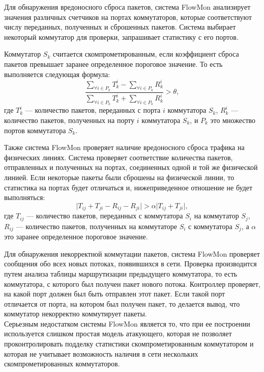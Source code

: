 \documentclass[../thesis.tex]{subfiles}
\begin{document}
Для обнаружения вредоносного сброса пакетов, система FlowMon анализирует значения различных счетчиков на портах коммутаторов, которые соответствуют числу переданных, полученных и сброшенных пакетов. 
Система выбирает некоторый коммутатор  для проверки, запрашивает статистику с его портов.

Коммутатор $S_k$ считается скомпрометированным, если коэффициент сброса пакетов превышает заранее определенное пороговое значение.
То есть выполняется следующая формула:
\begin{equation}
\frac{
    \sum_{\forall i\in P_k}{T^i_k} - \sum_{\forall i\in P_k}{R^i_k}
}{
    \sum_{\forall i\in P_k}{T^i_k} + \sum_{\forall i\in P_k}{R^i_k}
} > \theta,
\end{equation}
где $T^i_k$ --- количество пакетов, переданных с порта $i$ коммутатора $S_k$, $R^i_k$ --- количество пакетов, полученных на порту $i$ коммутатора $S_k$, и $P_k$ это множество портов коммутатора $S_k$.

Также система FlowMon проверяет наличие вредоносного сброса трафика на физических линиях.
Система проверяет соответствие количества пакетов, отправленных и полученных на портах, соединенных одной и той же физической линией.
Если некоторые пакеты были сброшены на физической линии, то статистика на портах будет отличаться и, нижеприведенное отношение не будет выполняться:
\begin{equation}
\Big|T_{ij} + T_{ji} - R_{ij} - R_{ji}\Big| > \alpha\Big|T_{ij} + T_{ji}\Big|,
\end{equation}
где $T_{ij}$ --- количество пакетов, переданных с коммутатора $S_i$ на коммутатор $S_j$, $R_{ij}$ --- количество пакетов, полученных на коммутаторе $S_i$ с коммутатора $S_j$, а $\alpha$ это заранее определенное пороговое значение.

Для обнаружения некорректной коммутации пакетов, система FlowMon проверяет сообщения обо всех новых потоках, появившихся в сети.
Проверка производится путем анализа таблицы маршрутизации предыдущего коммутатора, то есть коммутатора, с которого был получен пакет нового потока.
Контроллер проверяет, на какой порт должен был быть отправлен этот пакет.
Если такой порт отличается от порта, на котором был получен пакет, то делается вывод, что коммутатор некорректно коммутирует пакеты.
\\

Серьезным недостатком системы FlowMon является то, что при ее построении используется слишком простая модель атакующего, которая не позволяет проконтролировать подделку статистики скомпрометированным коммутатором и которая не учитывает возможность наличия в сети нескольких скомпрометированных коммутаторов.
\end{document}
